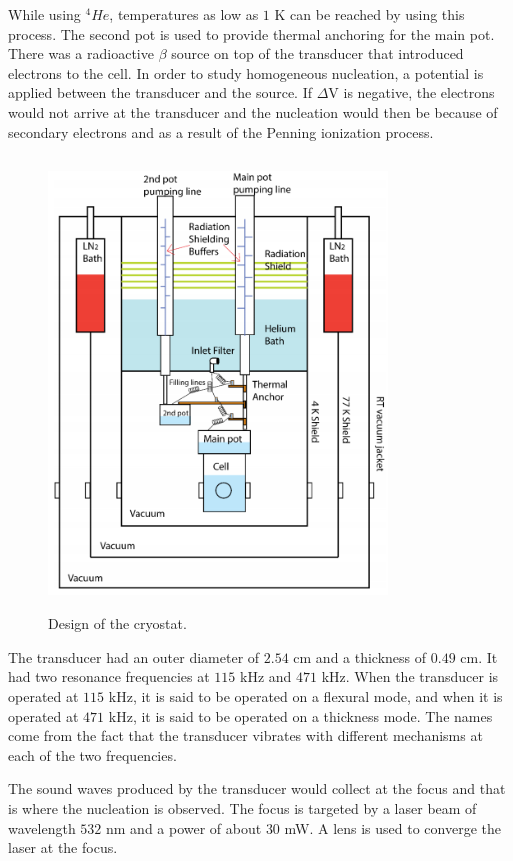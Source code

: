 While using $^4He$, temperatures as low as $1$ K can be reached by using this process. The second pot is used to provide thermal anchoring for the main pot. There was a radioactive $\beta$ source on top of the transducer that introduced electrons to the cell. In order to study homogeneous nucleation, a potential is applied between the transducer and the source. If $\Delta$V is negative, the electrons would not arrive at the transducer and the nucleation would then be because of secondary electrons and as a result of the Penning ionization process.
\begin{figure}[H]
\centering 
\includegraphics[width=90mm, height=120mm]{Nucleation_Experiment/cryostat.png}
\caption{Design of the cryostat. \cite{Yang2018thesis}}
\label{cryostatfig}
\end{figure}
The transducer had an outer diameter of $2.54$ cm and a thickness of $0.49$ cm. It had two resonance frequencies at $115$ kHz and $471$ kHz. When the transducer is operated at $115$ kHz, it is said to be operated on a flexural mode, and when it is operated at $471$ kHz, it is said to be operated on a thickness mode. The names come from the fact that the transducer vibrates with different mechanisms at each of the two frequencies. 

The sound waves produced by the transducer would collect at the focus and that is where the nucleation is observed. The focus is targeted by a laser beam of wavelength $532$ nm and a power of about $30$ mW. A lens is used to converge the laser at the focus. 

